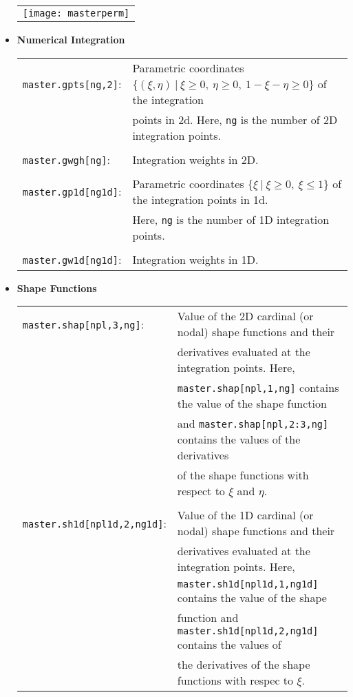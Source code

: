 \documentclass[11pt]{article}
\begin{document}
\begin{itemize}
\begin{tabular}{|ll}
	 \multicolumn{2}{|l}{ \texttt{[image: masterperm]}} \

\end{tabular}

\bigskip

\item {\bf Numerical Integration}

\begin{tabular}{|ll}
        \texttt{master.gpts[ng,2]}: & Parametric coordinates $\{(\xi, \eta) \ | \ \xi \ge 0, \ \eta \ge 0, \ 1-\xi-\eta \ge 0 \}$ of the integration \\ & points in 2d. Here, \texttt{ng} is the number of 2D integration points.  \\  
            \\ 
        \texttt{master.gwgh[ng]}: & Integration weights in 2D. \\
           \\
         \texttt{master.gp1d[ng1d]}: & Parametric coordinates $\{\xi \ | \ \xi \ge 0, \ \xi \le 1 \}$ of the integration points in 1d. \\ & Here, \texttt{ng} is the number of 1D integration points.             \\  \\ 
        \texttt{master.gw1d[ng1d]}: & Integration weights in 1D. \\
\end{tabular}

\bigskip

\item {\bf Shape Functions}

\begin{tabular}{|ll}
        \texttt{master.shap[npl,3,ng]}: & Value of the 2D cardinal (or nodal) shape functions and their \\ & derivatives  evaluated at the integration points. Here,  \\ & \texttt{master.shap[npl,1,ng]}  contains the value of the shape function \\ & and  \texttt{master.shap[npl,2:3,ng]}  contains the values of the
        derivatives \\ & of the shape functions with respect  to  $\xi$ and $\eta$. 
            \\  \\ 
       \texttt{master.sh1d[npl1d,2,ng1d]}: & Value of the 1D cardinal (or nodal) shape functions and their \\ & derivatives evaluated at the integration points. Here, \\ &  \texttt{master.sh1d[npl1d,1,ng1d]}   contains the value of the shape \\ &  function and  \texttt{master.sh1d[npl1d,2,ng1d]}  contains the values of \\ & the
        derivatives of  the shape functions with respec  to  $\xi$. 
\end{tabular}


\end{itemize}
\end{document}
